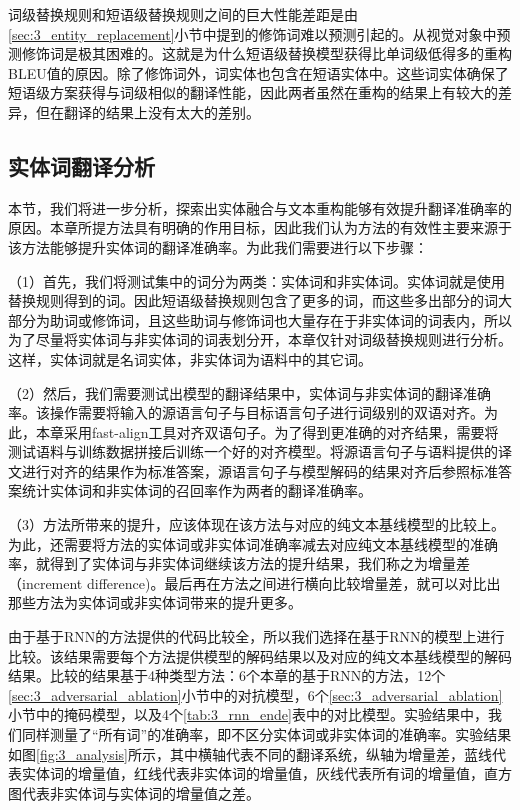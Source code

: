 词级替换规则和短语级替换规则之间的巨大性能差距是由\ref{sec:3_entity_replacement}小节中提到的修饰词难以预测引起的。从视觉对象中预测修饰词是极其困难的。这就是为什么短语级替换模型获得比单词级低得多的重构BLEU值的原因。除了修饰词外，词实体也包含在短语实体中。这些词实体确保了短语级方案获得与词级相似的翻译性能，因此两者虽然在重构的结果上有较大的差异，但在翻译的结果上没有太大的差别。

\subsection{实体词翻译分析}
本节，我们将进一步分析，探索出实体融合与文本重构能够有效提升翻译准确率的原因。本章所提方法具有明确的作用目标，因此我们认为方法的有效性主要来源于该方法能够提升实体词的翻译准确率。为此我们需要进行以下步骤：

（1）首先，我们将测试集中的词分为两类：实体词和非实体词。实体词就是使用替换规则得到的词。因此短语级替换规则包含了更多的词，而这些多出部分的词大部分为助词或修饰词，且这些助词与修饰词也大量存在于非实体词的词表内，所以为了尽量将实体词与非实体词的词表划分开，本章仅针对词级替换规则进行分析。这样，实体词就是名词实体，非实体词为语料中的其它词。

（2）然后，我们需要测试出模型的翻译结果中，实体词与非实体词的翻译准确率。该操作需要将输入的源语言句子与目标语言句子进行词级别的双语对齐。为此，本章采用fast-align工具对齐双语句子。为了得到更准确的对齐结果，需要将测试语料与训练数据拼接后训练一个好的对齐模型。将源语言句子与语料提供的译文进行对齐的结果作为标准答案，源语言句子与模型解码的结果对齐后参照标准答案统计实体词和非实体词的召回率作为两者的翻译准确率。

（3）方法所带来的提升，应该体现在该方法与对应的纯文本基线模型的比较上。为此，还需要将方法的实体词或非实体词准确率减去对应纯文本基线模型的准确率，就得到了实体词与非实体词继续该方法的提升结果，我们称之为增量差（increment difference)。最后再在方法之间进行横向比较增量差，就可以对比出那些方法为实体词或非实体词带来的提升更多。


由于基于RNN的方法提供的代码比较全，所以我们选择在基于RNN的模型上进行比较。该结果需要每个方法提供模型的解码结果以及对应的纯文本基线模型的解码结果。比较的结果基于4种类型方法：6个本章的基于RNN的方法，12个\ref{sec:3_adversarial_ablation}小节中的对抗模型，6个\ref{sec:3_adversarial_ablation}小节中的掩码模型，以及4个\ref{tab:3_rnn_ende}表中的对比模型。实验结果中，我们同样测量了“所有词”的准确率，即不区分实体词或非实体词的准确率。实验结果如图\ref{fig:3_analysis}所示，其中横轴代表不同的翻译系统，纵轴为增量差，蓝线代表实体词的增量值，红线代表非实体词的增量值，灰线代表所有词的增量值，直方图代表非实体词与实体词的增量值之差。

